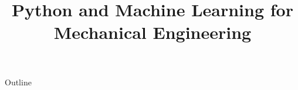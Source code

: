 \documentclass[xcolor=dvipsnames,compress,t,pdf,notes]{beamer}
\title[\insertframenumber /\inserttotalframenumber]{Python and Machine Learning for Mechanical Engineering}
\begin{document}
	\begin{frame}
	\titlepage
	\end{frame}
	
	\begin{frame}{Outline}
	    \tableofcontents
	\end{frame}

	
	
	
\end{document}
